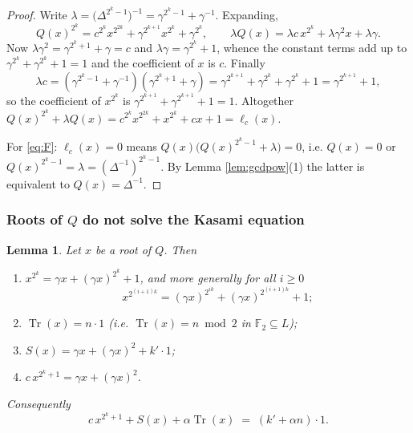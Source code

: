 \documentclass[11pt,a4paper]{article}
\newtheorem{lemma}[theorem]{Lemma}
\theoremstyle{definition}
\newcommand{\F}{\mathbb{F}}
\newcommand{\Tr}{\operatorname{Tr}}
\begin{document}
\begin{proof}
Write $\lambda=\bigl(\Delta^{2^{k}-1}\bigr)^{-1}=\gamma^{2^{k}-1}+\gamma^{-1}$.
Expanding,
\[
  Q(x)^{2^{k}}=c^{2^{k}}x^{2^{2k}}+\gamma^{2^{k+1}}x^{2^{k}}+\gamma^{2^{k}},
  \qquad
  \lambda Q(x)=\lambda c\,x^{2^{k}}+\lambda\gamma^{2}x+\lambda\gamma .
\]
Now $\lambda\gamma^{2}=\gamma^{2^{k}+1}+\gamma=c$ and
$\lambda\gamma=\gamma^{2^{k}}+1$, whence the constant terms add up to
$\gamma^{2^{k}}+\gamma^{2^{k}}+1=1$ and the coefficient of $x$ is $c$.  Finally
\[
  \lambda c=(\gamma^{2^{k}-1}+\gamma^{-1})(\gamma^{2^{k}+1}+\gamma)
  =\gamma^{2^{k+1}}+\gamma^{2^{k}}+\gamma^{2^{k}}+1=\gamma^{2^{k+1}}+1 ,
\]
so the coefficient of $x^{2^{k}}$ is $\gamma^{2^{k+1}}+\gamma^{2^{k+1}}+1=1$.
Altogether $Q(x)^{2^{k}}+\lambda Q(x)=c^{2^{k}}x^{2^{2k}}+x^{2^{k}}+cx+1=\ell_c(x)$.

For \eqref{eq:F}: $\ell_c(x)=0$ means $Q(x)\bigl(Q(x)^{2^{k}-1}+\lambda\bigr)=0$,
i.e. $Q(x)=0$ or $Q(x)^{2^{k}-1}=\lambda=(\Delta^{-1})^{2^{k}-1}$.  By Lemma
\ref{lem:gcdpow}(1) the latter is equivalent to $Q(x)=\Delta^{-1}$.
\end{proof}

\subsubsection{Roots of $Q$ do not solve the Kasami equation}

\begin{lemma}\label{lem:Qroot}
Let $x$ be a root of $Q$.  Then
\begin{enumerate}
\item $x^{2^{k}}=\gamma x+(\gamma x)^{2^{k}}+1$, and more generally for all
      $i\ge0$
      \[
        x^{2^{(i+1)k}}=(\gamma x)^{2^{ik}}+(\gamma x)^{2^{(i+1)k}}+1 ;
      \]
\item $\Tr(x)=n\cdot 1$ (i.e. $\Tr(x)=n\bmod 2$ in $\F_2\subseteq L$);
\item $S(x)=\gamma x+(\gamma x)^{2}+k'\cdot1$;
\item $c\,x^{2^{k}+1}=\gamma x+(\gamma x)^{2}$.
\end{enumerate}
Consequently
\begin{equation}\label{eq:efinal}
  c\,x^{2^{k}+1}+S(x)+\alpha\Tr(x)\;=\;(k'+\alpha n)\cdot 1 .
\end{equation}
\end{lemma}
\end{document}
